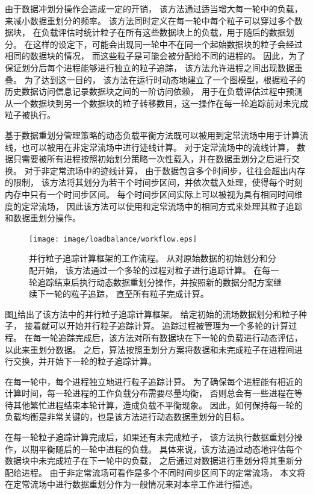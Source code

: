 由于数据冲划分操作会造成一定的开销，
该方法通过适当增大每一轮中的负载，来减小数据重划分的频率。
该方法同时定义在每一轮中每个粒子可以穿过多个数据块，
在负载评估时统计粒子在所有这些数据块上的负载，用于随后的数据划分。
在这样的设定下，可能会出现同一轮中不在同一个起始数据块的粒子会经过相同的数据块的情况，
而这些粒子是可能会被分配给不同的进程的。
因此，为了保证划分后每个进程能够进行独立的粒子追踪，
该方法允许进程之间出现数据重叠。
为了达到这一目的，
该方法在运行时动态地建立了一个图模型，根据粒子的历史数据访问信息记录数据块之间的一阶访问依赖，
用于在负载评估过程中预测从一个数据块到另一个数据块的粒子转移数目，这一操作在每一轮追踪前对未完成粒子被执行。

基于数据重划分管理策略的动态负载平衡方法既可以被用到定常流场中用于计算流线，也可以被用在非定常流场中进行迹线计算。
对于定常流场中的流线计算，
数据只需要被所有进程按照初始划分策略一次性载入，并在数据重划分之后进行交换。
对于非定常流场中的迹线计算，
由于数据包含多个时间步，往往会超出内存的限制，
该方法将其划分为若干个时间步区间，并依次载入处理，使得每个时刻内存中只有一个时间步区间。
每个时间步区间实际上可以被视为具有相同时间维度的定常流场，
因此该方法可以使用和定常流场中的相同方式来处理其粒子追踪和数据重划分操作。

\begin{figure}[H]
  \centering
  \texttt{[image: image/loadbalance/workflow.eps]}
  \caption{
    并行粒子追踪计算框架的工作流程\parencite{ZhangGYP18}。
    从对原始数据的初始划分和分配开始，
    该方法通过一个多轮的过程对粒子进行追踪计算。
    在每一轮追踪结束后执行动态数据重划分操作，并按照新的数据分配方案继续下一轮的粒子追踪，
    直至所有粒子完成计算。
 }
\label{fig:dynamicdr:workflow}
\end{figure}

图\ref{fig:dynamicdr:workflow}给出了该方法中的并行粒子追踪计算框架。
给定初始的流场数据划分和粒子种子，
接着就可以开始并行粒子追踪计算。
追踪过程被管理为一个多轮的计算过程。
在每一轮追踪完成后，该方法对所有数据块在下一轮的负载进行动态评估，以此来重划分数据。
之后，算法按照重划分方案将数据和未完成粒子在进程间进行交换，并开始下一轮的粒子追踪计算。

在每一轮中，每个进程独立地进行粒子追踪计算。
为了确保每个进程能有相近的计算时间，每一轮进程的工作负载分布需要尽量均衡，
否则总会有一些进程在等待其他繁忙进程结束本轮计算，造成负载不平衡现象。
因此，如何保持每一轮的负载均衡是非常关键的，也是该方法进行动态数据重划分的目标。 

在每一轮粒子追踪计算完成后，如果还有未完成粒子，
该方法执行数据重划分操作，以期平衡随后的一轮中进程的负载。
具体来说，该方法通过动态地评估每个数据块中未完成粒子在下一轮中的负载，
之后通过对数据进行重划分将其重新分配给进程。
由于非定常流场可看作是多个不同时间步区间下的定常流场，
本文将在定常流场中进行数据重划分作为一般情况来对本章工作进行描述。

